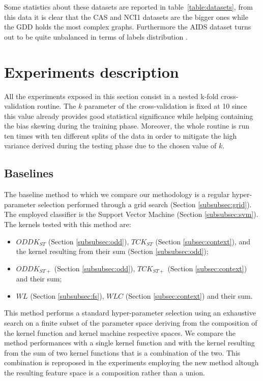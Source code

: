Some statistics about these datasets are reported in table~\ref{table:datasets},
from this data it is clear that the CAS and NCI1 datasets are the bigger ones
while the GDD holds the most complex graphs.
Furthermore the AIDS dataset turns out to be quite unbalanced in terms of labels
distribution \cite{rtesselli}.  


\section{Experiments description}
\label{sec:description}

All the experiments exposed in this section consist in a nested k-fold
cross-validation routine.
The $k$ parameter of the cross-validation is fixed at 10 since this value
already provides good statistical significance while helping containing the bias
skewing during the training phase.
Moreover, the whole routine is run ten times with ten different splits of the
data in order to mitigate the high variance derived during the testing phase due to the
chosen value of $k$.

\subsection{Baselines}
\label{subsec:baselines}
The baseline method to which we compare our methodology is a regular hyper-parameter selection
performed through a grid search (Section \ref{subsubsec:grid}).
The employed classifier is the Support Vector Machine (Section \ref{subsubsec:svm}).
The kernels tested with this method are:
\begin{itemize}
    \item $ODDK_{ST}$ (Section \ref{subsubsec:odd}), $TCK_{ST}$ (Section \ref{subsec:context}), and the kernel resulting
        from their sum (Section \ref{subsubsec:odd});
    \item $ODDK_{ST+}$ (Section \ref{subsubsec:odd}), $TCK_{ST+}$ (Section \ref{subsec:context}) and their sum;
    \item $WL$ (Section \ref{subsubsec:fs}), $WLC$ (Section \ref{subsec:context}) and their sum.
\end{itemize}

This method performs a standard hyper-parameter selection using an exhaustive search
on a finite subset of the parameter space deriving from the composition of the
kernel function and kernel machine respective spaces.
We compare the method performances with a single kernel function and with the
kernel resulting from the sum of two kernel functions that is a combination of the two.
This combination is reproposed in the experiments employing the new method altough
the resulting feature space is a composition rather than a union.

